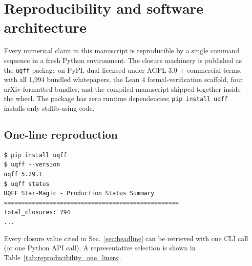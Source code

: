 
\section{Reproducibility and software architecture}
\label{sec:reproducibility}

Every numerical claim in this manuscript is reproducible by a single
command sequence in a fresh Python environment. The closure machinery
is published as the \texttt{uqff} package on PyPI, dual-licensed under
AGPL-3.0 + commercial terms, with all 1{,}994 bundled whitepapers,
the Lean 4 formal-verification scaffold, four arXiv-formatted bundles,
and the compiled manuscript shipped together inside the wheel. The
package has zero runtime dependencies; \texttt{pip install uqff}
installs only stdlib-using code.

\subsection{One-line reproduction}
\label{sec:one_line}

\begin{verbatim}
$ pip install uqff
$ uqff --version
uqff 5.29.1
$ uqff status
UQFF Star-Magic - Production Status Summary
==================================================
total_closures: 794
...
\end{verbatim}

Every closure value cited in Sec.~\ref{sec:headline} can be retrieved
with one CLI call (or one Python API call). A representative selection
is shown in Table~\ref{tab:reproducibility_one_liners}.

